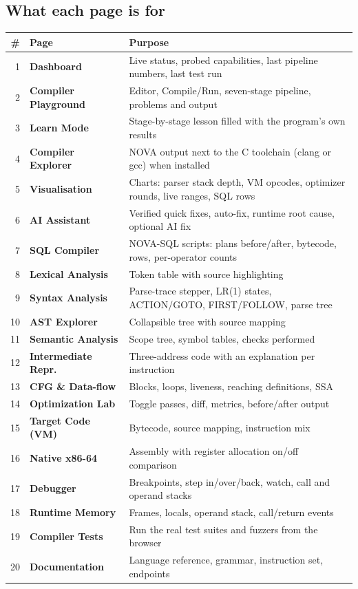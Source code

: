 \documentclass[11pt,a4paper]{article}
\begin{document}
\subsection{What each page is for}
\begin{center}\footnotesize
\begin{tabularx}{\linewidth}{@{}r >{\bfseries}l X@{}}\toprule
\#&Page&Purpose\\\midrule
1&Dashboard&Live status, probed capabilities, last pipeline numbers, last test run\\
2&Compiler Playground&Editor, Compile/Run, seven-stage pipeline, problems and output\\
3&Learn Mode&Stage-by-stage lesson filled with the program's own results\\
4&Compiler Explorer&NOVA output next to the C toolchain (clang or gcc) when installed\\
5&Visualisation&Charts: parser stack depth, VM opcodes, optimizer rounds, live ranges, SQL rows\\
6&AI Assistant&Verified quick fixes, auto-fix, runtime root cause, optional AI fix\\
7&SQL Compiler&NOVA-SQL scripts: plans before/after, bytecode, rows, per-operator counts\\
8&Lexical Analysis&Token table with source highlighting\\
9&Syntax Analysis&Parse-trace stepper, LR(1) states, ACTION/GOTO, FIRST/FOLLOW, parse tree\\
10&AST Explorer&Collapsible tree with source mapping\\
11&Semantic Analysis&Scope tree, symbol tables, checks performed\\
12&Intermediate Repr.&Three-address code with an explanation per instruction\\
13&CFG \& Data-flow&Blocks, loops, liveness, reaching definitions, SSA\\
14&Optimization Lab&Toggle passes, diff, metrics, before/after output\\
15&Target Code (VM)&Bytecode, source mapping, instruction mix\\
16&Native x86-64&Assembly with register allocation on/off comparison\\
17&Debugger&Breakpoints, step in/over/back, watch, call and operand stacks\\
18&Runtime Memory&Frames, locals, operand stack, call/return events\\
19&Compiler Tests&Run the real test suites and fuzzers from the browser\\
20&Documentation&Language reference, grammar, instruction set, endpoints\\\bottomrule
\end{tabularx}
\end{center}
\end{document}
